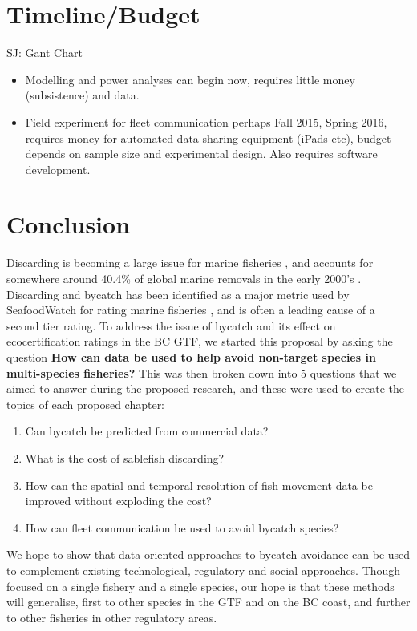 \documentclass{article}
\newcommand{\sj}[1]{{\color{red}\mbox{}\marginpar{\raggedleft\hspace{0pt}*} SJ: #1}}
\begin{document}
\section{Timeline/Budget}

\sj{Gant Chart}

\begin{itemize}
  \item Modelling and power analyses can begin now, requires little money (subsistence) and data.
  \item Field experiment for fleet communication perhaps Fall 2015, Spring 2016, requires money for automated data sharing equipment (iPads etc), budget depends on sample size and experimental design. Also requires software development.
\end{itemize}


\section{Conclusion}

Discarding is becoming a large issue for marine fisheries \citep{kelleher2005discards}, and accounts for somewhere around 40.4\% of global marine removals in the early 2000's \citep{davies2009defining}. Discarding and bycatch has been identified as a major metric used by SeafoodWatch for rating marine fisheries \citep{Pelc201556}, and is often a leading cause of a second tier rating. To address the issue of bycatch and its effect on ecocertification ratings in the BC GTF, we started this proposal by asking the question {\bf How can data be used to help avoid non-target species in multi-species fisheries?} This was then broken down into 5 questions that we aimed to answer during the proposed research, and these were used to create the topics of each proposed chapter:
\begin{enumerate}
  \item Can bycatch be predicted from commercial data?
  \item What is the cost of sablefish discarding?
  \item How can the spatial and temporal resolution of fish movement data be improved without exploding the cost?
  \item How can fleet communication be used to avoid bycatch species?
\end{enumerate}

We hope to show that data-oriented approaches to bycatch avoidance can be used to complement existing technological, regulatory and social approaches. Though focused on a single fishery and a single species, our hope is that these methods will generalise, first to other species in the GTF and on the BC coast, and further to other fisheries in other regulatory areas.
\end{document}
